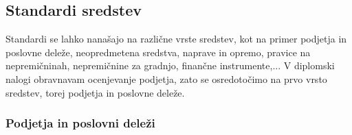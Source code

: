 \documentclass{article}
\begin{document}
\subsection{Standardi sredstev}
Standardi se lahko nanašajo na različne vrste sredstev, kot na primer podjetja in poslovne deleže, neopredmetena sredstva, naprave in opremo, pravice na nepremičninah, nepremičnine za gradnjo, finančne instrumente,... V diplomski nalogi obravnavam ocenjevanje podjetja, zato se osredotočimo na prvo vrsto sredstev, torej podjetja in poslovne deleže.
\subsubsection{Podjetja in poslovni deleži}
\end{document}
